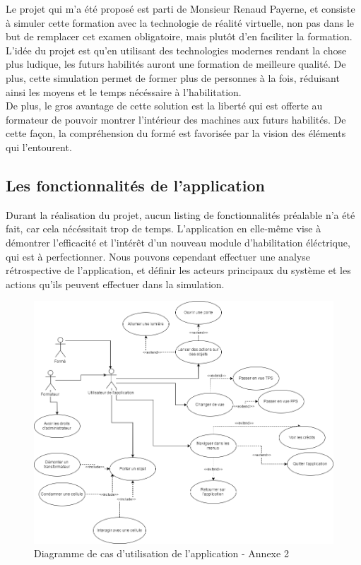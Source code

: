 \documentclass[a4paper]{article}
\begin{document}
        Le projet qui m'a été proposé est parti de Monsieur Renaud Payerne, et consiste à simuler cette formation avec la technologie de réalité virtuelle, non pas dans le but de remplacer cet examen obligatoire, mais plutôt d'en faciliter la formation. \\

        L'idée du projet est qu'en utilisant des technologies modernes rendant la chose plus ludique, les futurs habilités auront une formation de meilleure qualité. De plus, cette simulation permet de former plus de personnes à la fois, réduisant ainsi les moyens et le temps nécéssaire à l'habilitation. \\   

        De plus, le gros avantage de cette solution est la liberté qui est offerte au formateur de pouvoir montrer l'intérieur des machines aux futurs habilités. De cette façon, la compréhension du formé est favorisée par la vision des éléments qui l'entourent. \\

    \subsection{Les fonctionnalités de l'application}

    Durant la réalisation du projet, aucun listing de fonctionnalités préalable n'a été fait, car cela nécéssitait trop de temps. L'application en elle-même vise à démontrer l'efficacité et l'intérêt d'un nouveau module d'habilitation éléctrique, qui est à perfectionner. Nous pouvons cependant effectuer une analyse rétrospective de l'application, et définir les acteurs principaux du système et les actions qu'ils peuvent effectuer dans la simulation. \\

    \begin{figure}[H]
        \includegraphics[scale=0.5]{img/UseCases}
        \caption{Diagramme de cas d'utilisation de l'application - Annexe 2}
    \end{figure}
\end{document}
